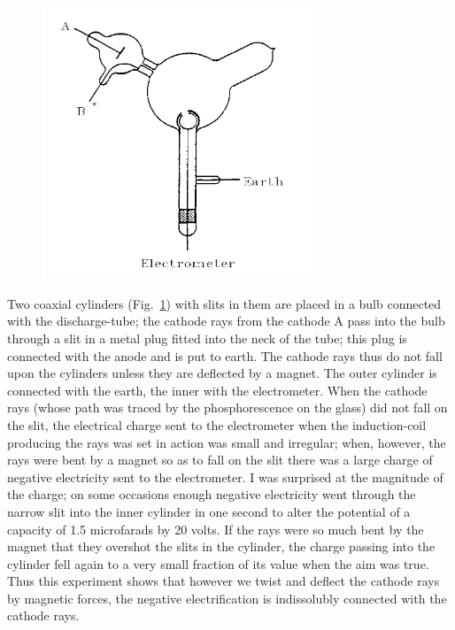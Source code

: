 \begin{figure}
  \begin{center}
    \includegraphics[width=3.17361in,height=3.2in]{images/02_thomson/image007.png}
  \end{center}
  \vspace*{-5mm}
  \caption{}
  \label{fig:thomson_1}
\end{figure}
  

Two coaxial cylinders (Fig.~\ref{fig:thomson_1}) with slits in them are placed in a bulb
connected with the discharge-tube; the cathode rays from the cathode A
pass into the bulb through a slit in a metal plug fitted into the neck
of the tube; this plug is connected with the anode and is put to earth.
The cathode rays thus do not fall upon the cylinders unless they are
deflected by a magnet. The outer cylinder is connected with the earth,
the inner with the electrometer. When the cathode rays (whose path was
traced by the phosphorescence on the glass) did not fall on the slit,
the electrical charge sent to the electrometer when the induction-coil
producing the rays was set in action was small and irregular; when,
however, the rays were bent by a magnet so as to fall on the slit there
was a large charge of negative electricity sent to the electrometer. I
was surprised at the magnitude of the charge; on some occasions enough
negative electricity went through the narrow slit into the inner
cylinder in one second to alter the potential of a capacity of 1.5
microfarads by 20 volts. If the rays were so much bent by the magnet
that they overshot the slits in the cylinder, the charge passing into
the cylinder fell again to a very small fraction of its value when the
aim was true. Thus this experiment shows that however we twist and
deflect the cathode rays by magnetic forces, the negative
electrification is indissolubly connected with the cathode rays.

